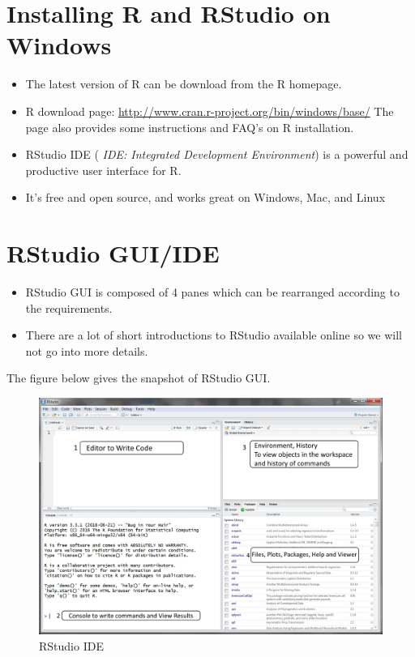 \documentclass[]{book}
\begin{document}
\section{Installing R and RStudio on Windows}\label{Rinstall}

\begin{itemize}
\item
  The latest version of R can be download from the R homepage.
\item
  R download page: \url{http://www.cran.r-project.org/bin/windows/base/}
  The page also provides some instructions and FAQ's on R installation.
\item
  RStudio IDE ( \emph{IDE: Integrated Development Environment}) is a
  powerful and productive user interface for R.
\item
  It's free and open source, and works great on Windows, Mac, and Linux
\end{itemize}

\section{RStudio GUI/IDE}\label{rstudio-guiide}

\begin{itemize}
\item
  RStudio GUI is composed of 4 panes which can be rearranged according
  to the requirements.
\item
  There are a lot of short introductions to RStudio available online so
  we will not go into more details.
\end{itemize}

The figure below gives the snapshot of RStudio GUI.

\begin{figure}
\centering
\includegraphics{Figure-1.2-RStudio.jpg}
\caption{\label{fig:unnamed-chunk-2}RStudio IDE}
\end{figure}
\end{document}
